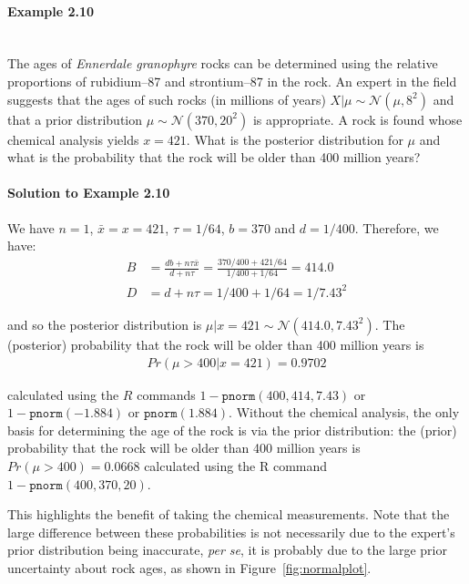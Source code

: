 \paragraph{Example 2.10}{~\\
The ages of {\it Ennerdale granophyre} rocks can be determined using \label{ex:rocks} the relative proportions of rubidium--87 and strontium--87 in the rock. An expert in the field suggests that the ages of such rocks (in millions of years) $X|\mu\sim \mathcal{N}(\mu,8^2)$ and that a prior distribution $\mu\sim \mathcal{N}(370,20^2)$ is appropriate. A rock is found whose chemical analysis yields $x=421$. What is the posterior distribution for $\mu$ and what is the probability that the rock will be older than 400 million years?

\paragraph{Solution to Example 2.10}{
    
        We have $n=1$, $\bar x=x=421$, $\tau=1/64$, $b=370$ and $d=1/400$. Therefore, we have:
        \begin{align*}
        B&=\frac{db+n\tau\bar x}{d+n\tau}
        =\frac{370/400+421/64}{1/400+1/64}=414.0\\
        D&=d+n\tau=1/400+1/64=1/7.43^2
        \end{align*}
        
        and so the posterior distribution is $\mu|x=421\sim \mathcal{N}(414.0,7.43^2)$. The (posterior) probability that the rock will be older than 400 million years is
        \begin{align*}
        Pr(\mu>400|x=421)=0.9702
        \end{align*}
        
        calculated using the $R$ commands $1-\texttt{pnorm}(400,414,7.43)$ or $1-\texttt{pnorm}(-1.884)$ or $\texttt{pnorm}(1.884)$. Without the chemical analysis, the only basis for determining the age of the rock is via the prior distribution: the (prior) probability that the rock will be older than 400 million years is $Pr(\mu>400)=0.0668$ calculated using the R command $1-\texttt{pnorm}(400,370,20)$.
        
    
}


\newpage

This highlights the benefit of taking the chemical measurements. Note that the large difference between these probabilities is not necessarily due to the expert's prior distribution being inaccurate, {\it per se}, it is probably due to the large prior uncertainty about rock ages, as shown in Figure~\ref{fig:normalplot}.
\begin{figure}[ht]


\end{figure}}
